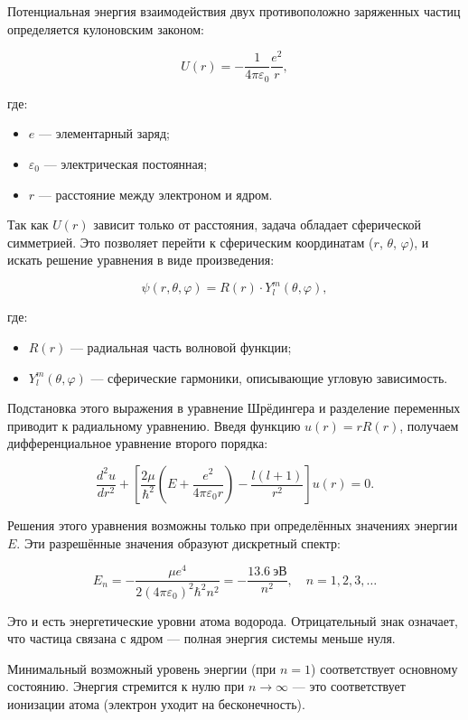 \documentclass[12pt]{article}
\begin{document}
Потенциальная энергия взаимодействия двух противоположно заряженных частиц определяется кулоновским законом:

\[
U(r) = -\frac{1}{4\pi \varepsilon_0} \frac{e^2}{r},
\]

где:

\begin{itemize}
    \item $e$ — элементарный заряд;
    \item $\varepsilon_0$ — электрическая постоянная;
    \item $r$ — расстояние между электроном и ядром.
\end{itemize}

Так как $U(r)$ зависит только от расстояния, задача обладает сферической симметрией. Это позволяет перейти к сферическим координатам ($r$, $\theta$, $\varphi$), и искать решение уравнения в виде произведения:

$$
\psi(r, \theta, \varphi) = R(r) \cdot Y_l^m(\theta, \varphi),
$$

где:

\begin{itemize}
    \item $R(r)$ — радиальная часть волновой функции;
    \item $Y_l^m(\theta, \varphi)$ — сферические гармоники, описывающие угловую зависимость.
\end{itemize}

Подстановка этого выражения в уравнение Шрёдингера и разделение переменных приводит к радиальному уравнению. Введя функцию $u(r) = r R(r)$, получаем дифференциальное уравнение второго порядка:

$$
\frac{d^2 u}{dr^2} + \left[ \frac{2\mu}{\hbar^2} \left( E + \frac{e^2}{4\pi \varepsilon_0 r} \right) - \frac{l(l+1)}{r^2} \right] u(r) = 0.
$$

Решения этого уравнения возможны только при определённых значениях энергии $E$. Эти разрешённые значения образуют дискретный спектр:

$$
E_n = -\frac{\mu e^4}{2 (4\pi \varepsilon_0)^2 \hbar^2 n^2} = -\frac{13.6~\text{эВ}}{n^2}, \quad n = 1, 2, 3, \dots
$$

Это и есть энергетические уровни атома водорода. Отрицательный знак означает, что частица связана с ядром — полная энергия системы меньше нуля.

Минимальный возможный уровень энергии (при $n = 1$) соответствует основному состоянию. Энергия стремится к нулю при $n \to \infty$ — это соответствует ионизации атома (электрон уходит на бесконечность).
\end{document}
